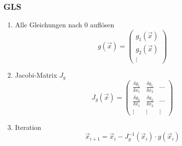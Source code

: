 \subsubsection*{GLS}
\begin{enumerate}

	\item Alle Gleichungen nach 0 auflösen
	\begin{displaymath}
		g(\vec{x}) =
		\begin{pmatrix}
			g_1(\vec{x}) \\
			g_2(\vec{x}) \\
			\vdots
		\end{pmatrix}
	\end{displaymath}
	
	\item Jacobi-Matrix $J_g$
	\begin{displaymath}
		J_g(\vec{x}) =
		\begin{pmatrix}
			\frac{\delta g_1}{\delta x_1}  & \frac{\delta g_1}{\delta x_2} & \cdots \\[5pt]
			\frac{\delta g_2}{\delta x_1}  & \frac{\delta g_2}{\delta x_2} & \cdots \\
			\vdots & \vdots & \vdots
		\end{pmatrix}
	\end{displaymath}
	
	\item Iteration
	\begin{displaymath}
		\vec{x}_{i+1} = \vec{x}_i - J_g^{-1}(\vec{x}_i) \cdot g(\vec{x}_i)
	\end{displaymath}

\end{enumerate}




